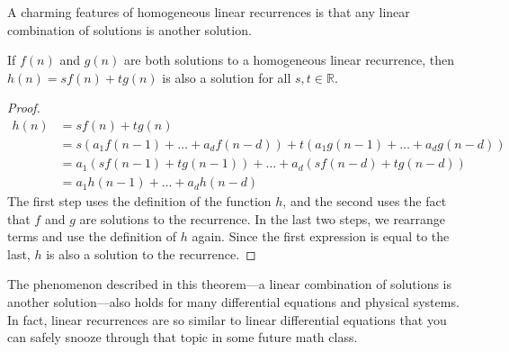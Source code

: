 A charming features of homogeneous linear recurrences is that any
linear combination of solutions is another solution.

\begin{theorem}
\label{th:recur-linearity}
  If $f(n)$ and $g(n)$ are both solutions to a homogeneous linear
  recurrence, then $h(n) = s f(n) + t g(n)$ is also a solution for all $s, t \in
  \mathbb{R}$.
\end{theorem}
\begin{proof}
\begin{align*}
h(n) & = sf(n) + tg(n) \\
  & = s \left(a_1 f(n-1) + \ldots + a_d f(n - d)\right) + t \left(a_1 g(n-1) + \ldots + a_d g(n -
    d)\right) \\
 & = a_1 (s f(n-1) + t g(n-1)) + \ldots + a_d (s f(n-d) + t g(n-d)) \\
  & =  a_1 h(n-1) + \ldots + a_d h(n-d)
\end{align*}
The first step uses the definition of the function $h$, and the second
uses the fact that $f$ and $g$ are solutions to the recurrence.  In
the last two steps, we rearrange terms and use the definition of $h$
again.  Since the first expression is equal to the last, $h$ is also a
solution to the recurrence.
\end{proof}

The phenomenon described in this theorem---a linear combination of
solutions is another solution---also holds for many differential
equations and physical systems.  In fact, linear recurrences are so
similar to linear differential equations that you can safely snooze
through that topic in some future math class.

